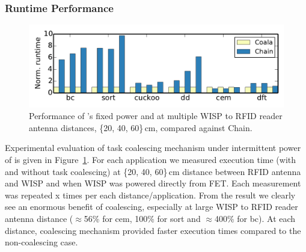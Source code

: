 
\subsubsection{\sys Runtime Performance}
\label{sec:result_coalescing}

\begin{figure}
	\centering
	\includegraphics[width=\columnwidth]{figures/coala_chain}
	\caption{Performance of \sys's fixed power and at multiple WISP to RFID reader antenna distances, \{20, 40, 60\}\,cm, compared against Chain.}
	\label{fig:coalescing}
\end{figure}

Experimental evaluation of task coalescing mechanism under intermittent power of \sys is given in Figure~\ref{fig:coalescing}. For each application we measured execution time (with and without task coalescing) at \{20, 40, 60\}\,cm distance between RFID antenna and WISP and when WISP was powered directly from FET. Each measurement was repeated x times per each distance/application. From the result we clearly see an enormous benefit of coalescing, especially at large WISP to RFID reader antenna distance ($\approx$56\% for cem, 100\% for sort and $\approx$400\% for bc). At each distance, \sys coalescing mechanism provided faster execution times compared to the non-coalescing case. 

